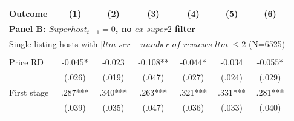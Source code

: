 \begin{tabular}{lcccccc}
\hline
Outcome & (1) & (2) & (3) & (4) & (5) & (6)
\\ \hline
\multicolumn{7}{l}{\textbf{Panel B: $Superhost_{t-1}=0$, no $ex\_super2$ filter}} \\
\multicolumn{7}{l}{Single-listing hosts with $|ltm\_scr-number\_of\_reviews\_ltm|\leq 2$ (N=6525)} \\
\\
Price RD & -0.045* & -0.023 & -0.108** & -0.044* & -0.034 & -0.055*
\\
 & (.026) & (.019) & (.047) & (.027) & (.024) & (.029)
\\
First stage & .287*** & .340*** & .263*** & .321*** & .331*** & .281***
\\
 & (.039) & (.035) & (.047) & (.036) & (.033) & (.040)
\\
\hline
\end{tabular}
